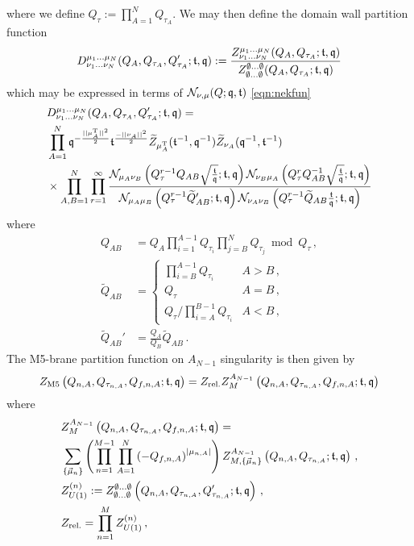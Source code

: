 \documentclass[main.tex]{subfiles}
\begin{document}
where we define $Q_{\tau}:=\prod_{A=1}^NQ_{\tau_A}$. We may then define the domain wall partition function
\begin{align}
D^{\mu_1\dots\mu_N}_{\nu_1\dots\nu_N}(Q_{A},Q_{\tau_A},Q_{\tau_A}';\mathfrak{t},\mathfrak{q}):=\frac{Z^{\mu_1\dots\mu_N}_{\nu_1\dots\nu_N}(Q_{A},Q_{\tau_A};\mathfrak{t},\mathfrak{q})}{Z^{\emptyset\dots\emptyset}_{\emptyset\dots\emptyset}(Q_{A},Q_{\tau_A};\mathfrak{t},\mathfrak{q})}
\end{align}
which may be expressed in terms of $\mathcal{N}_{\nu,\mu}(Q;\mathfrak{q},\mathfrak{t})$ \eqref{eqn:nekfun}
\begin{equation}\label{eqn:domwall}
\begin{aligned}
&D^{\mu_1\dots\mu_N}_{\nu_1\dots\nu_N}(Q_{A},Q_{\tau_A},Q_{\tau_A}';\mathfrak{t},\mathfrak{q})=\\
&\prod_{A=1}^N\mathfrak{q}^{-\frac{||\mu_A^{\operatorname{T}}||^2}{2}}\mathfrak{t}^{\frac{-||\nu_A||^2}{2}}\widetilde{Z}_{\mu_A^{\operatorname{T}}}(\mathfrak{t}^{-1},\mathfrak{q}^{-1})\widetilde{Z}_{\nu_A}(\mathfrak{q}^{-1},\mathfrak{t}^{-1})\\
&\times\prod_{A,B=1}^N\prod_{r=1}^{\infty}\frac{\mathcal{N}_{\mu_A\nu_B}\left(Q_{\tau}^{r-1}Q_{AB}\sqrt{\frac{\mathfrak{t}}{\mathfrak{q}}};\mathfrak{t},\mathfrak{q}\right)\mathcal{N}_{\nu_B\mu_A}\left(Q_{\tau}^{r}Q_{AB}^{-1}\sqrt{\frac{\mathfrak{t}}{\mathfrak{q}}};\mathfrak{t},\mathfrak{q}\right)}{\mathcal{N}_{\mu_A\mu_B}\left(Q_{\tau}^{r-1}\widetilde{Q}'_{AB};\mathfrak{t},\mathfrak{q}\right)\mathcal{N}_{\nu_A\nu_B}\left(Q_{\tau}^{r-1}\widetilde{Q}_{AB}\frac{\mathfrak{t}}{\mathfrak{q}};\mathfrak{t},\mathfrak{q}\right)}
\end{aligned}
\end{equation}
where
\begin{align}
Q_{AB}&=Q_A\prod_{i=1}^{A-1}Q_{\tau_i}\prod_{j=B}^NQ_{\tau_j}\bmod Q_{\tau}\,,\\
\widetilde{Q}_{AB}&=\begin{cases}
\prod_{i=B}^{A-1}Q_{\tau_i}&\text{$A>B$}\,,\\
Q_{\tau}&\text{$A=B$}\,,\\
Q_{\tau}/\prod_{i=A}^{B-1}Q_{\tau_i}&\text{$A<B$}\,,
\end{cases}\\
\widetilde{Q}_{AB}'&=\frac{Q_A}{Q_B}\widetilde{Q}_{AB}\,.
\end{align}
The M5-brane partition function on $A_{N-1}$ singularity is then given by
\begin{equation}
Z_{\text{M5}}\left(Q_{n,A},Q_{\tau_{n,A}},Q_{f,n,A};\mathfrak{t},\mathfrak{q}\right)=Z_{\text{rel.}}Z_M^{A_{N-1}}\left(Q_{n,A},Q_{\tau_{n,A}},Q_{f,n,A};\mathfrak{t},\mathfrak{q}\right)
\end{equation}
where
\begin{align}
&\begin{aligned}
&Z_{M}^{A_{N-1}}\left(Q_{n,A},Q_{\tau_{n,A}},Q_{f,n,A};\mathfrak{t},\mathfrak{q}\right)=\\
&\sum_{\{\vec{\mu}_{n}\}}\left(\prod_{n=1}^{M-1}\prod_{A=1}^N\left(-Q_{f,n,A}\right)^{|\mu_{n,A}|}\right)Z_{M,\{\vec{\mu}_{n}\}}^{A_{N-1}}\left(Q_{n,A},Q_{\tau_{n,A}};\mathfrak{t},\mathfrak{q}\right)\,,\end{aligned}\\
&Z_{U(1)}^{(n)}:=Z^{\emptyset\dots\emptyset}_{\emptyset\dots\emptyset}\left(Q_{n,A},Q_{\tau_{n,A}},Q_{\tau_{n,A}}';\mathfrak{t},\mathfrak{q}\right)\,,\\
&Z_{\text{rel.}}=\prod_{n=1}^MZ_{U(1)}^{(n)}\,,
\end{align}
\end{document}
